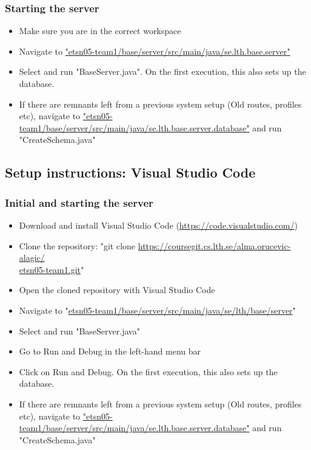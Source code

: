 \documentclass{article}
\begin{document}
\subsubsection{Starting the server}
\begin{itemize}
\item Make sure you are in the correct workspace
\item Navigate to \url{"etsn05-team1/base/server/src/main/java/se.lth.base.server"}
\item Select and run "BaseServer.java". On the first execution, this also sets up the database.
\item If there are remnants left from a previous system setup (Old routes, profiles etc), navigate to \url{"etsn05-team1/base/server/src/main/java/se.lth.base.server.database"} and run "CreateSchema.java"
\end{itemize}


\subsection{Setup instructions:  Visual Studio Code}

\subsubsection{Initial and starting the server}
\begin{itemize}
\item Download and install Visual Studio Code (\url{https://code.visualstudio.com/})
\item Clone the repository: "git clone \url{https://coursegit.cs.lth.se/alma.orucevic-alagic/} \\
\url{etsn05-team1.git}"
\item Open the cloned repository with Visual Studio Code
\item Navigate to "\url{etsn05-team1/base/server/src/main/java/se/lth/base/server}"
\item Select and run "BaseServer.java"
\item Go to Run and Debug in the left-hand menu bar
\item Click on Run and Debug. On the first execution, this also sets up the database.
\item If there are remnants left from a previous system setup (Old routes, profiles etc), navigate to \url{"etsn05-team1/base/server/src/main/java/se.lth.base.server.database"} and run "CreateSchema.java"
\end{itemize}
\end{document}
